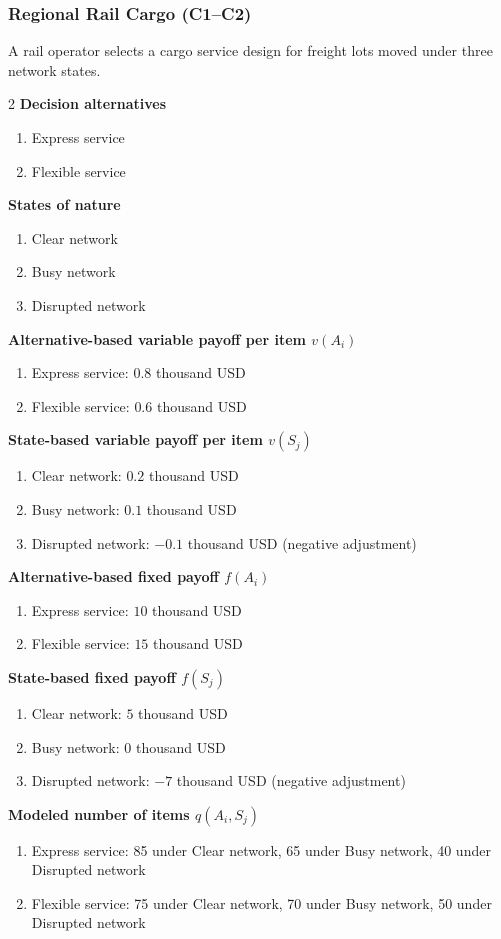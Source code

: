 	\subsubsection{Regional Rail Cargo (C1--C2)}
	\label{sec:problem35-regional-rail-cargo-c1-c2}
	A rail operator selects a cargo service design for freight lots moved under three network states.
	\begin{multicols}{2}
	\textbf{Decision alternatives}
	\begin{enumerate}[label=\arabic*.]
\item Express service
\item Flexible service
	\end{enumerate}
	\textbf{States of nature}
	\begin{enumerate}[label=\arabic*.]
\item Clear network
\item Busy network
\item Disrupted network
	\end{enumerate}
	\columnbreak
	\textbf{Alternative-based variable payoff per item $v(A_i)$}
\begin{enumerate}[label=\arabic*.]
\item Express service: $0.8$ thousand USD
\item Flexible service: $0.6$ thousand USD\end{enumerate}
\textbf{State-based variable payoff per item $v(S_j)$}
\begin{enumerate}[label=\arabic*.]
\item Clear network: $0.2$ thousand USD
\item Busy network: $0.1$ thousand USD
\item Disrupted network: $-0.1$ thousand USD (negative adjustment)\end{enumerate}
\textbf{Alternative-based fixed payoff $f(A_i)$}
\begin{enumerate}[label=\arabic*.]
\item Express service: $10$ thousand USD
\item Flexible service: $15$ thousand USD\end{enumerate}
\textbf{State-based fixed payoff $f(S_j)$}
\begin{enumerate}[label=\arabic*.]
\item Clear network: $5$ thousand USD
\item Busy network: $0$ thousand USD
\item Disrupted network: $-7$ thousand USD (negative adjustment)\end{enumerate}
\textbf{Modeled number of items $q(A_i,S_j)$}
\begin{enumerate}[label=\arabic*.]
\item Express service: 85 under Clear network, 65 under Busy network, 40 under Disrupted network
\item Flexible service: 75 under Clear network, 70 under Busy network, 50 under Disrupted network
\end{enumerate}
	\end{multicols}

